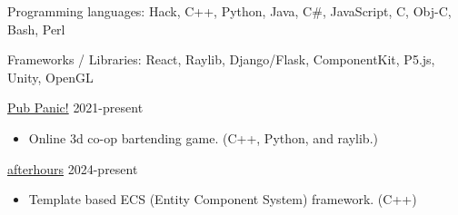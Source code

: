 \documentclass[11pt]{article}
\begin{document}
\inlineskillsection  %
{Programming languages:}
{ Hack, C++, Python, Java, C\#, JavaScript, C, Obj-C, Bash, Perl }

\inlineskillsection  
{Frameworks / Libraries:}
{ React, Raylib, Django/Flask, ComponentKit, P5.js, Unity, OpenGL}



\spacedhrule{0.2em}{0.2em}  %
\projects
{{\href{https://github.com/gabeochoa/pharmasea}{Pub Panic!}} }{2021-present}
{
    \begin{itemize}[label={}]
        \setlength\itemsep{.005ex}
        \item{Online 3d co-op bartending game. (C++, Python, and raylib.)}
    \end{itemize}
}

\projects
{{\href{https://github.com/gabeochoa/afterhours}{afterhours}} }{2024-present}
{
    \begin{itemize}[label={}]
        \setlength\itemsep{.005ex}
        \item{Template based ECS (Entity Component System) framework. (C++)}
    \end{itemize}
}


%
%
\end{document}
